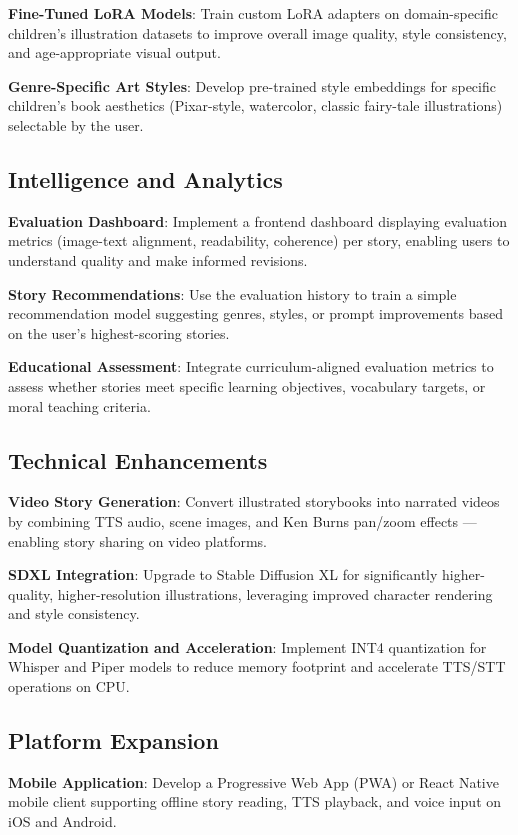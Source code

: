 \textbf{Fine-Tuned LoRA Models}: Train custom LoRA adapters on domain-specific children's illustration datasets to improve overall image quality, style consistency, and age-appropriate visual output.

\textbf{Genre-Specific Art Styles}: Develop pre-trained style embeddings for specific children's book aesthetics (Pixar-style, watercolor, classic fairy-tale illustrations) selectable by the user.

\subsection{Intelligence and Analytics}

\textbf{Evaluation Dashboard}: Implement a frontend dashboard displaying evaluation metrics (image-text alignment, readability, coherence) per story, enabling users to understand quality and make informed revisions.

\textbf{Story Recommendations}: Use the evaluation history to train a simple recommendation model suggesting genres, styles, or prompt improvements based on the user's highest-scoring stories.

\textbf{Educational Assessment}: Integrate curriculum-aligned evaluation metrics to assess whether stories meet specific learning objectives, vocabulary targets, or moral teaching criteria.

\subsection{Technical Enhancements}

\textbf{Video Story Generation}: Convert illustrated storybooks into narrated videos by combining TTS audio, scene images, and Ken Burns pan/zoom effects — enabling story sharing on video platforms.

\textbf{SDXL Integration}: Upgrade to Stable Diffusion XL for significantly higher-quality, higher-resolution illustrations, leveraging improved character rendering and style consistency.

\textbf{Model Quantization and Acceleration}: Implement INT4 quantization for Whisper and Piper models to reduce memory footprint and accelerate TTS/STT operations on CPU.

\subsection{Platform Expansion}

\textbf{Mobile Application}: Develop a Progressive Web App (PWA) or React Native mobile client supporting offline story reading, TTS playback, and voice input on iOS and Android.

